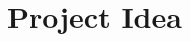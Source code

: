 \documentclass[12pt, oneside, a4paper]{book}
\begin{document}
\pagestyle{plain}

\frontmatter


\tableofcontents

\mainmatter
\chapter{Project Idea}


\backmatter
\end{document}
